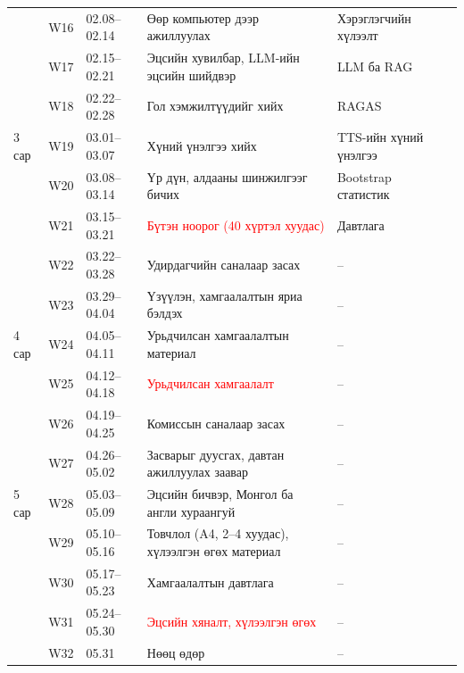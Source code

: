 {\begin{longtable}{|p{1.0cm}|p{0.9cm}|p{1.85cm}|p{6.0cm}|p{3.0cm}|p{1.3cm}|}
 & W16 & 02.08--02.14 & Өөр компьютер дээр ажиллуулах & Хэрэглэгчийн хүлээлт & \\
 & W17 & 02.15--02.21 & Эцсийн хувилбар, LLM-ийн эцсийн шийдвэр & LLM ба RAG & \\
 & W18 & 02.22--02.28 & Гол хэмжилтүүдийг хийх & RAGAS & \\
\hline
3 сар & W19 & 03.01--03.07 & Хүний үнэлгээ хийх & TTS-ийн хүний үнэлгээ & \\
 & W20 & 03.08--03.14 & Үр дүн, алдааны шинжилгээг бичих & Bootstrap статистик & \\
 & W21 & 03.15--03.21 & \textcolor{red}{Бүтэн ноорог (40 хүртэл хуудас)} & Давтлага & \\
 & W22 & 03.22--03.28 & Удирдагчийн саналаар засах & -- & \\
 & W23 & 03.29--04.04 & Үзүүлэн, хамгаалалтын яриа бэлдэх & -- & \\
\hline
4 сар & W24 & 04.05--04.11 & Урьдчилсан хамгаалалтын материал & -- & \\
 & W25 & 04.12--04.18 & \textcolor{red}{Урьдчилсан хамгаалалт} & -- & \\
 & W26 & 04.19--04.25 & Комиссын саналаар засах & -- & \\
 & W27 & 04.26--05.02 & Засварыг дуусгах, давтан ажиллуулах заавар & -- & \\
\hline
5 сар & W28 & 05.03--05.09 & Эцсийн бичвэр, Монгол ба англи хураангуй & -- & \\
 & W29 & 05.10--05.16 & Товчлол (A4, 2--4 хуудас), хүлээлгэн өгөх материал & -- & \\
 & W30 & 05.17--05.23 & Хамгаалалтын давтлага & -- & \\
 & W31 & 05.24--05.30 & \textcolor{red}{Эцсийн хяналт, хүлээлгэн өгөх} & -- & \\
 & W32 & 05.31 & Нөөц өдөр & -- & \\
\hline
\end{longtable}
}


